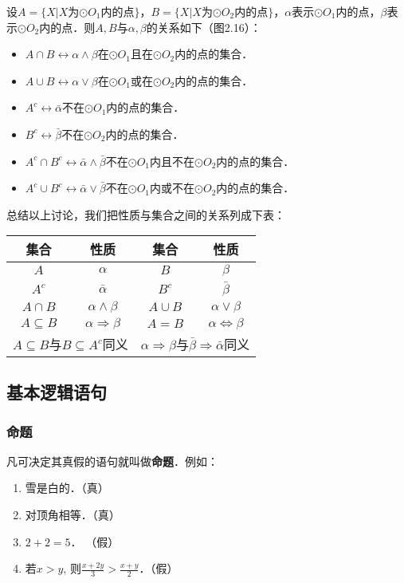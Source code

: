 设$A=\{X|X\text{为$\odot O_1$内的点}\}$，$B=\{X|X\text{为$\odot O_2$内的点}\}$，$\alpha$表示$\odot O_1$内的点，$\beta$表示$\odot O_2$内的点．则$A,B$与$\alpha,\beta$的关系如下（图2.16）：
\begin{itemize}
	\item $A\cap B \longleftrightarrow \alpha\wedge \beta$\quad 在$\odot O_1$且在$\odot O_2$内的点的集合．
	\item $A\cup B\longleftrightarrow \alpha\vee \beta$\quad 在$\odot O_1$或在$\odot O_2$内的点的集合．
	\item $A^c\longleftrightarrow \bar{\alpha}$\quad 不在$\odot O_1$内的点的集合．
	\item $B^c\longleftrightarrow \bar{\beta}$\quad 不在$\odot O_2$内的点的集合．
	\item $A^c\cap B^c\longleftrightarrow \bar\alpha\wedge\bar\beta $\quad 不在$\odot O_1$内且不在$\odot O_2$内的点的集合．
	\item $A^c\cup B^c\longleftrightarrow \bar\alpha\vee\bar\beta$\quad 不在$\odot O_1$内或不在$\odot O_2$内的点的集合．
\end{itemize}

总结以上讨论，我们把性质与集合之间的关系列成下表：
\begin{center}
	\begin{tabular}{cc|cc}
		\hline
		集合  & 性质 &集合  &性质\\
		\hline
		$A$ & $\alpha$ & $B$ & $\beta$\\
		$A^c$ & $\bar\alpha$ & $B^c$ & $\bar\beta$\\
		$A\cap B$ & $\alpha\wedge \beta$ & $A\cup B$ & $\alpha\vee\beta$\\
		$A\subseteq B$ & $\alpha\Rightarrow\beta $& $A=B$&$\alpha\Leftrightarrow \beta$\\
		\multicolumn{2}{c|}{$A\subseteq B$与$B\subseteq A^c$同义}& \multicolumn{2}{|c}{$\alpha\Rightarrow\beta$与$\bar\beta\Rightarrow\bar\alpha$同义}\\
		\hline
	\end{tabular}
\end{center}

\subsection{基本逻辑语句}
\subsubsection{命题}
凡可决定其真假的语句就叫做\textbf{命题}．例如：
\begin{enumerate}
	\item 雪是白的．（真）
	\item 对顶角相等．（真）
	\item $2+2=5$． （假）
	\item 若$x>y$, 则$\frac{x+2y}{3}>\frac{x+y}{2}$．（假）
\end{enumerate}

